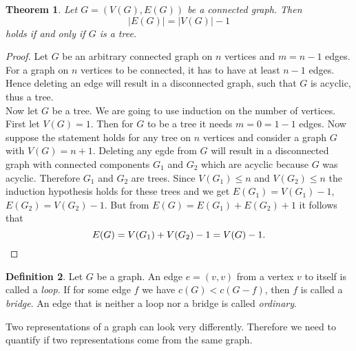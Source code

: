 \documentclass[12pt,a4paper, twoside, autooneside=false]{scrartcl}
\newtheorem{theorem}{Theorem}[section]
\theoremstyle{definition}
\newtheorem{definition}[theorem]{Definition}
\theoremstyle{remark}
\numberwithin{equation}{section}
\begin{document}
\begin{theorem}
Let $G = (V(G), E(G))$ be a connected graph. Then 
\[
|E(G)| = |V(G)| - 1
\]
holds if and only if $G$ is a tree.
\end{theorem}
\begin{proof}
Let $G$ be an arbitrary connected graph on $n$ vertices and $m = n - 1$ edges. For a graph on $n$ vertices to be connected, it has to have at least $n - 1$ edges. Hence deleting an edge will result in a disconnected graph, such that $G$ is acyclic, thus a tree. \\
\indent Now let $G$ be a tree. We are going to use induction on the number of vertices. First let $V(G) = 1$. Then for $G$ to be a tree it needs $m = 0 = 1 - 1$ edges. Now suppose the statement holds for any tree on $n$ vertices and consider a graph $G$ with $V(G) = n + 1$. Deleting any egde from $G$ will result in a disconnected graph with connected components $G_1$ and $G_2$ which are acyclic because $G$ was acyclic. Therefore $G_1$ and $G_2$ are trees. Since $V(G_1) \leq n$ and $V(G_2) \leq n$ the induction hypothesis holds for these trees and we get $E(G_1) = V(G_1) - 1$, $E(G_2) = V(G_2) - 1$. But from $E(G) = E(G_1) + E(G_2) + 1$ it follows that 
\[
E(G) = V(G_1) + V(G_2) - 1 = V(G) - 1. \qedhere
\]
\end{proof}
\begin{definition} Let $G$ be a graph. An edge $e = (v,v)$ from a vertex $v$ to itself is called a \textit{loop}. If for some edge $f$ we have $c(G) < c(G - f)$, then $f$ is called a \textit{bridge}. An edge that is neither a loop nor a bridge is called \textit{ordinary}.
\end{definition}
\begin{center}
\label{fig:label}
\end{center}  
Two representations of a graph can look very differently. Therefore we need to quantify if two representations come from the same graph.
\end{document}
